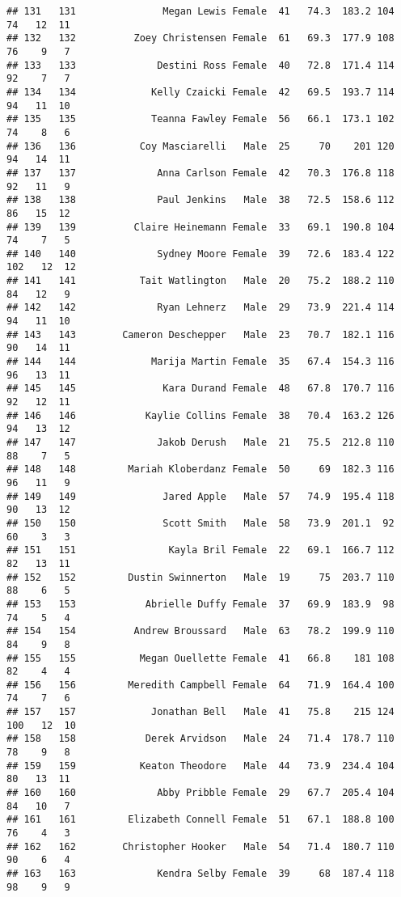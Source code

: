 \documentclass[
]{article}
\begin{document}
\begin{verbatim}
## 131   131               Megan Lewis Female  41   74.3  183.2 104  74   12  11
## 132   132          Zoey Christensen Female  61   69.3  177.9 108  76    9   7
## 133   133              Destini Ross Female  40   72.8  171.4 114  92    7   7
## 134   134             Kelly Czaicki Female  42   69.5  193.7 114  94   11  10
## 135   135             Teanna Fawley Female  56   66.1  173.1 102  74    8   6
## 136   136           Coy Masciarelli   Male  25     70    201 120  94   14  11
## 137   137              Anna Carlson Female  42   70.3  176.8 118  92   11   9
## 138   138              Paul Jenkins   Male  38   72.5  158.6 112  86   15  12
## 139   139          Claire Heinemann Female  33   69.1  190.8 104  74    7   5
## 140   140              Sydney Moore Female  39   72.6  183.4 122 102   12  12
## 141   141           Tait Watlington   Male  20   75.2  188.2 110  84   12   9
## 142   142              Ryan Lehnerz   Male  29   73.9  221.4 114  94   11  10
## 143   143        Cameron Deschepper   Male  23   70.7  182.1 116  90   14  11
## 144   144             Marija Martin Female  35   67.4  154.3 116  96   13  11
## 145   145               Kara Durand Female  48   67.8  170.7 116  92   12  11
## 146   146            Kaylie Collins Female  38   70.4  163.2 126  94   13  12
## 147   147              Jakob Derush   Male  21   75.5  212.8 110  88    7   5
## 148   148         Mariah Kloberdanz Female  50     69  182.3 116  96   11   9
## 149   149               Jared Apple   Male  57   74.9  195.4 118  90   13  12
## 150   150               Scott Smith   Male  58   73.9  201.1  92  60    3   3
## 151   151                Kayla Bril Female  22   69.1  166.7 112  82   13  11
## 152   152         Dustin Swinnerton   Male  19     75  203.7 110  88    6   5
## 153   153            Abrielle Duffy Female  37   69.9  183.9  98  74    5   4
## 154   154          Andrew Broussard   Male  63   78.2  199.9 110  84    9   8
## 155   155           Megan Ouellette Female  41   66.8    181 108  82    4   4
## 156   156         Meredith Campbell Female  64   71.9  164.4 100  74    7   6
## 157   157             Jonathan Bell   Male  41   75.8    215 124 100   12  10
## 158   158            Derek Arvidson   Male  24   71.4  178.7 110  78    9   8
## 159   159           Keaton Theodore   Male  44   73.9  234.4 104  80   13  11
## 160   160              Abby Pribble Female  29   67.7  205.4 104  84   10   7
## 161   161         Elizabeth Connell Female  51   67.1  188.8 100  76    4   3
## 162   162        Christopher Hooker   Male  54   71.4  180.7 110  90    6   4
## 163   163              Kendra Selby Female  39     68  187.4 118  98    9   9

\end{verbatim}
\end{document}

